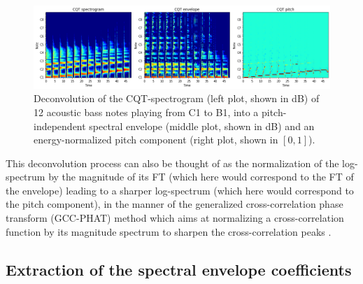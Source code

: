 \documentclass[journal]{IEEEtran}
\begin{document}
\begin{figure}[htp]
    \centering
    \includegraphics[width=\textwidth]{deconvolution.png}
    \caption{Deconvolution of the CQT-spectrogram (left plot, shown in dB) of 12 acoustic bass notes playing from C1 to B1, into a pitch-independent spectral envelope (middle plot, shown in dB) and an energy-normalized pitch component (right plot, shown in $[0, 1]$).}
    \label{fig:deconvolution}
\end{figure}

This deconvolution process can also be thought of as the normalization of the log-spectrum by the magnitude of its FT (which here would correspond to the FT of the envelope) leading to a sharper log-spectrum (which here would correspond to the pitch component), in the manner of the generalized cross-correlation phase transform (GCC-PHAT) method which aims at normalizing a cross-correlation function by its magnitude spectrum to sharpen the cross-correlation peaks \cite{knapp1976}.


\subsection{Extraction of the spectral envelope coefficients}
\end{document}
